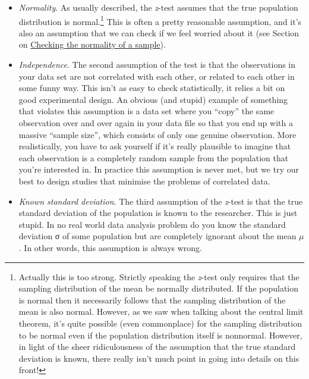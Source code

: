 \documentclass[
  a4paper,
]{book}
\providecommand{\tightlist}{%
  \setlength{\itemsep}{0pt}\setlength{\parskip}{0pt}}\usepackage{longtable,booktabs,array}
\begin{document}
\begin{itemize}
\tightlist
\item
  \emph{Normality}. As usually described, the \emph{z}-test assumes that
  the true population distribution is normal.\footnote{Actually this is
    too strong. Strictly speaking the \emph{z}-test only requires that
    the sampling distribution of the mean be normally distributed. If
    the population is normal then it necessarily follows that the
    sampling distribution of the mean is also normal. However, as we saw
    when talking about the central limit theorem, it's quite possible
    (even commonplace) for the sampling distribution to be normal even
    if the population distribution itself is nonnormal. However, in
    light of the sheer ridiculousness of the assumption that the true
    standard deviation is known, there really isn't much point in going
    into details on this front!} This is often a pretty reasonable
  assumption, and it's also an assumption that we can check if we feel
  worried about it (see Section on
  \protect\hyperlink{sec-Checking-the-normality-of-a-sample}{Checking
  the normality of a sample}).
\item
  \emph{Independence}. The second assumption of the test is that the
  observations in your data set are not correlated with each other, or
  related to each other in some funny way. This isn't as easy to check
  statistically, it relies a bit on good experimental design. An obvious
  (and stupid) example of something that violates this assumption is a
  data set where you ``copy'' the same observation over and over again
  in your data file so that you end up with a massive ``sample size'',
  which consists of only one genuine observation. More realistically,
  you have to ask yourself if it's really plausible to imagine that each
  observation is a completely random sample from the population that
  you're interested in. In practice this assumption is never met, but we
  try our best to design studies that minimise the problems of
  correlated data.
\item
  \emph{Known standard deviation}. The third assumption of the
  \emph{z}-test is that the true standard deviation of the population is
  known to the researcher. This is just stupid. In no real world data
  analysis problem do you know the standard deviation σ of some
  population but are completely ignorant about the mean \(\mu\). In
  other words, this assumption is always wrong.
\end{itemize}
\end{document}

